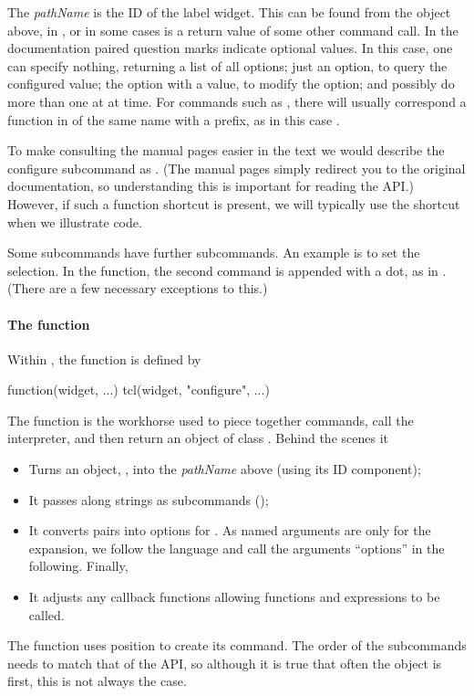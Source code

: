 The \textit{pathName} is the ID of the label widget. This can be found
from the object  above, in , or in some cases is a
return value of some other command call.  In the \TK\/ documentation
paired question marks indicate optional values. In this case, one can
specify nothing, returning a list of all options; just an option, to
query the configured value; the option with a value, to modify the
option; and possibly do more than one at at time.  For commands such
as , there will usually correspond a function in
\R\/ of the same name with a  prefix, as in this case
.

To make consulting the \TK\/ manual pages easier in the text we would
describe the configure subcommand as
. (The \R\/ manual pages
simply redirect you to the original \TK\/ documentation, so
understanding this is important for reading the API.) However, if such
a function shortcut is present, we will typically use the shortcut when we
illustrate code. 

Some subcommands have further subcommands. An example
is to set the selection. In the \R\/ function, the second command is
appended with a dot, as in . (There are a few
necessary exceptions to this.)

\paragraph{The  function} 
Within , the  function is defined by

\begin{Sinput}
function(widget, ...) tcl(widget, "configure", ...)
\end{Sinput}

The  function is the workhorse used to piece
together \TCL\/ commands, call the interpreter, and then return an
object of class .  Behind the scenes it
\begin{itemize}
\item Turns an \R\/
object, , into the \textit{pathName} above (using its ID
component);
\item It passes along strings as subcommands ();
\item It converts \R\/  pairs into 
  options for \TCL. As named arguments are only for the  expansion, we follow the \TCL\/ language and call the
  arguments ``options'' in the following. Finally,
\item It adjusts any callback functions allowing \R{} functions and
  expressions to be called.
\end{itemize}
The  function uses position to create its command. The
order of the subcommands needs to match that of the \TK\/ API, so
although it is true that often the \R\/ object is first, this is not
always the case.

